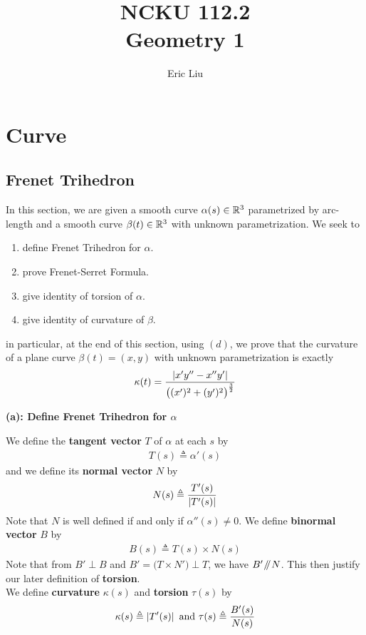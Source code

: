 \documentclass{report}
\title{\Huge{NCKU 112.2}\\
Geometry 1}
\author{\huge{Eric Liu}}
\date{}
\begin{document}
\maketitle
\newpage%
\tableofcontents
\pagebreak
\chapter{Curve}
\section{Frenet Trihedron}
\begin{mdframed}
In this section, we are given a smooth curve $\alpha (s)\in\mathbb{R}^3$ parametrized by arc-length and a smooth curve $\beta  (t)\in\mathbb{R}^3$ with unknown parametrization. We seek to 
\begin{enumerate}[label=(\alph*)]
  \item define Frenet Trihedron for $\alpha $.
  \item prove Frenet-Serret Formula.
  \item give identity of torsion of $\alpha $.
  \item give identity of curvature of $\beta $.
\end{enumerate}
in particular, at the end of this section, using $(d)$, we prove that the curvature of a plane curve $\beta (t)=(x,y)$ with unknown parametrization is exactly 
\begin{align*}
\kappa(t)=\frac{\left|x'y''-x''y'\right|}{\big((x')^{2}+(y')^{2} \big)^{\frac{3}{2}}}
\end{align*}
\end{mdframed}
\textbf{(a): Define Frenet Trihedron for $\alpha $}
\begin{mdframed}
We define the \textbf{tangent vector} $T$ of $\alpha $ at each $s$ by 
 \begin{align*}
T(s)\triangleq \alpha '(s)
\end{align*}
and we define its \textbf{normal vector} $N$ by
\begin{align*}
N(s)\triangleq \frac{T'(s)}{\left|T'(s)\right|}
\end{align*}
Note that $N$ is well defined if and only if  $\alpha ''(s)\neq 0$. We define  \textbf{binormal vector} $B$ by 
 \begin{align*}
B(s)\triangleq T(s)\times N(s)
\end{align*}
Note that from $B'\perp B$ and $B'=\big( T \times N'\big) \perp T$, we have $B'\mathbin{\!/\mkern-5mu/\!}  N$. This then justify our later definition of  \textbf{torsion}.\\

We define \textbf{curvature} $\kappa (s)$ and \textbf{torsion} $\tau(s)$ by 
\begin{align*}
\kappa(s)\triangleq \left|T'(s)\right|\text{ and }\tau(s)\triangleq \frac{B'(s)}{N(s)}
\end{align*}
\end{mdframed}
\end{document}
